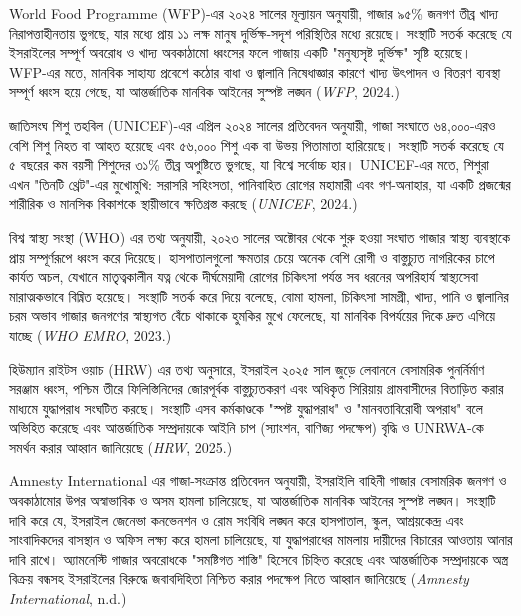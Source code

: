 World Food Programme (WFP)-এর ২০২৪ সালের মূল্যায়ন অনুযায়ী, গাজার ৯৫\% জনগণ তীব্র খাদ্য নিরাপত্তাহীনতায় ভুগছে, যার মধ্যে প্রায় ১১ লক্ষ মানুষ দুর্ভিক্ষ-সদৃশ পরিস্থিতির মধ্যে রয়েছে। সংস্থাটি সতর্ক করেছে যে ইসরাইলের সম্পূর্ণ অবরোধ ও খাদ্য অবকাঠামো ধ্বংসের ফলে গাজায় একটি "মনুষ্যসৃষ্ট দুর্ভিক্ষ" সৃষ্টি হয়েছে। WFP-এর মতে, মানবিক সাহায্য প্রবেশে কঠোর বাধা ও জ্বালানি নিষেধাজ্ঞার কারণে খাদ্য উৎপাদন ও বিতরণ ব্যবস্থা সম্পূর্ণ ধ্বংস হয়ে গেছে, যা আন্তর্জাতিক মানবিক আইনের সুস্পষ্ট লঙ্ঘন (\emph{WFP}, 2024.)

জাতিসংঘ শিশু তহবিল (UNICEF)-এর এপ্রিল ২০২৪ সালের প্রতিবেদন অনুযায়ী, গাজা সংঘাতে ৬৪,০০০-এরও বেশি শিশু নিহত বা আহত হয়েছে এবং ৫৬,০০০ শিশু এক বা উভয় পিতামাতা হারিয়েছে। সংস্থাটি সতর্ক করেছে যে ৫ বছরের কম বয়সী শিশুদের ৩১\% তীব্র অপুষ্টিতে ভুগছে, যা বিশ্বে সর্বোচ্চ হার। UNICEF-এর মতে, শিশুরা এখন "তিনটি থ্রেট"-এর মুখোমুখি: সরাসরি সহিংসতা, পানিবাহিত রোগের মহামারী এবং গণ-অনাহার, যা একটি প্রজন্মের শারীরিক ও মানসিক বিকাশকে স্থায়ীভাবে ক্ষতিগ্রস্ত করছে (\emph{UNICEF}, 2024.)

বিশ্ব স্বাস্থ্য সংস্থা (WHO) এর তথ্য অনুযায়ী, ২০২৩ সালের অক্টোবর থেকে শুরু হওয়া সংঘাত গাজার স্বাস্থ্য ব্যবস্থাকে প্রায় সম্পূর্ণরূপে ধ্বংস করে দিয়েছে। হাসপাতালগুলো ক্ষমতার চেয়ে অনেক বেশি রোগী ও বাস্তুচ্যুত নাগরিকের চাপে কার্যত অচল, যেখানে মাতৃত্বকালীন যত্ন থেকে দীর্ঘমেয়াদী রোগের চিকিৎসা পর্যন্ত সব ধরনের অপরিহার্য স্বাস্থ্যসেবা মারাত্মকভাবে বিঘ্নিত হয়েছে। সংস্থাটি সতর্ক করে দিয়ে বলেছে, বোমা হামলা, চিকিৎসা সামগ্রী, খাদ্য, পানি ও জ্বালানির চরম অভাব গাজার জনগণের স্বাস্থ্যগত বেঁচে থাকাকে হুমকির মুখে ফেলেছে, যা মানবিক বিপর্যয়ের দিকে দ্রুত এগিয়ে যাচ্ছে (\emph{WHO EMRO}, 2023.)

হিউম্যান রাইটস ওয়াচ (HRW) এর তথ্য অনুসারে, ইসরাইল ২০২৫ সাল জুড়ে লেবাননে বেসামরিক পুনর্নির্মাণ সরঞ্জাম ধ্বংস, পশ্চিম তীরে ফিলিস্তিনিদের জোরপূর্বক বাস্তুচ্যুতকরণ এবং অধিকৃত সিরিয়ায় গ্রামবাসীদের বিতাড়িত করার মাধ্যমে যুদ্ধাপরাধ সংঘটিত করছে। সংস্থাটি এসব কর্মকাণ্ডকে "স্পষ্ট যুদ্ধাপরাধ" ও "মানবতাবিরোধী অপরাধ" বলে অভিহিত করেছে এবং আন্তর্জাতিক সম্প্রদায়কে আইনি চাপ (স্যাংশন, বাণিজ্য পদক্ষেপ) বৃদ্ধি ও UNRWA-কে সমর্থন করার আহ্বান জানিয়েছে (\emph{HRW}, 2025.)

Amnesty International এর গাজা-সংক্রান্ত প্রতিবেদন অনুযায়ী, ইসরাইলি বাহিনী গাজার বেসামরিক জনগণ ও অবকাঠামোর উপর অস্বাভাবিক ও অসম হামলা চালিয়েছে, যা আন্তর্জাতিক মানবিক আইনের সুস্পষ্ট লঙ্ঘন। সংস্থাটি দাবি করে যে, ইসরাইল জেনেভা কনভেনশন ও রোম সংবিধি লঙ্ঘন করে হাসপাতাল, স্কুল, আশ্রয়কেন্দ্র এবং সাংবাদিকদের বাসস্থান ও অফিস লক্ষ্য করে হামলা চালিয়েছে, যা যুদ্ধাপরাধের মামলায় দায়ীদের বিচারের আওতায় আনার দাবি রাখে। অ্যামনেস্টি গাজার অবরোধকে "সমষ্টিগত শাস্তি" হিসেবে চিহ্নিত করেছে এবং আন্তর্জাতিক সম্প্রদায়কে অস্ত্র বিক্রয় বন্ধসহ ইসরাইলের বিরুদ্ধে জবাবদিহিতা নিশ্চিত করার পদক্ষেপ নিতে আহ্বান জানিয়েছে (\emph{Amnesty International}, n.d.)

